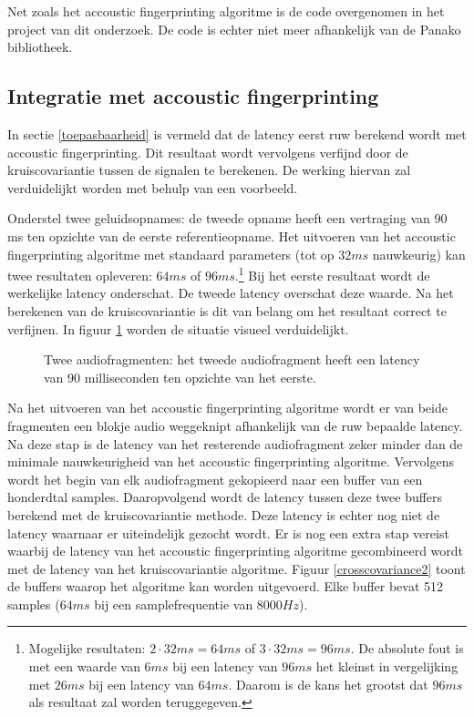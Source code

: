 Net zoals het accoustic fingerprinting algoritme is de code overgenomen in het project van dit onderzoek. De code is echter niet meer afhankelijk van de Panako bibliotheek.

\subsection{Integratie met accoustic fingerprinting}
\label{integratie-accoustic-fingerprinting}

In sectie \ref{toepasbaarheid} is vermeld dat de latency eerst ruw berekend wordt met accoustic fingerprinting. Dit resultaat wordt vervolgens verfijnd door de kruiscovariantie tussen de signalen te berekenen. De werking hiervan zal verduidelijkt worden met behulp van een voorbeeld.

Onderstel twee geluidsopnames: de tweede opname heeft een vertraging van 90 ms ten opzichte van de eerste referentieopname. Het uitvoeren van het accoustic fingerprinting algoritme met standaard parameters (tot op $ 32 ms $ nauwkeurig) kan twee resultaten opleveren: $ 64 ms $ of $ 96 ms $.\footnote{Mogelijke resultaten: $ 2 \cdot 32 ms = 64 ms$ of $ 3 \cdot 32 ms = 96 ms $. De absolute fout is  met een waarde van $ 6 ms $ bij een latency van $ 96 ms $ het kleinst in vergelijking met $ 26 ms $ bij een latency van $ 64 ms $. Daarom is de kans het grootst dat $ 96 ms $ als resultaat zal worden teruggegeven.} Bij het eerste resultaat wordt de werkelijke latency onderschat. De tweede latency overschat deze waarde. Na het berekenen van de kruiscovariantie is dit van belang om het resultaat correct te verfijnen. In figuur \ref{crosscovariance1} worden de situatie visueel verduidelijkt.

\begin{figure}[h!]
	\captionsetup{width=0.7\textwidth}
	\caption[Kruiscovariantie audiofragmenten]{Twee audiofragmenten: het tweede audiofragment heeft een latency van 90 milliseconden ten opzichte van het eerste.}
	\begin{center}
		\advance\parskip0.3cm
		
	\end{center}
	\label{crosscovariance1}
\end{figure}

Na het uitvoeren van het accoustic fingerprinting algoritme wordt er van beide fragmenten een blokje audio weggeknipt afhankelijk van de ruw bepaalde latency. Na deze stap is de latency van het resterende audiofragment zeker minder dan de minimale nauwkeurigheid van het accoustic fingerprinting algoritme. Vervolgens wordt het begin van elk audiofragment gekopieerd naar een buffer van een honderdtal samples. Daaropvolgend wordt de latency tussen deze twee buffers berekend met de kruiscovariantie methode. Deze latency is echter nog niet de latency waarnaar er uiteindelijk gezocht wordt. Er is nog een extra stap vereist waarbij de latency van het accoustic fingerprinting algoritme gecombineerd wordt met de latency van het kruiscovariantie algoritme. Figuur \ref{crosscovariance2} toont de buffers waarop het algoritme kan worden uitgevoerd. Elke buffer bevat 512 samples ($ 64 ms $ bij een samplefrequentie van $ 8000 Hz $).

